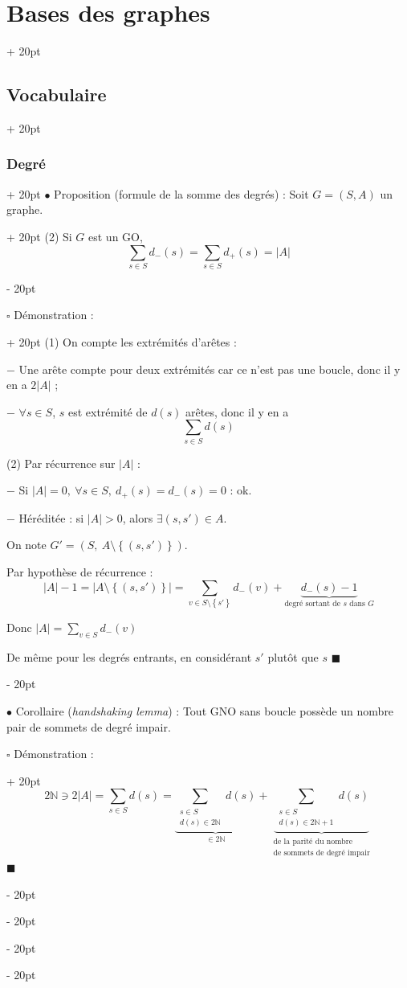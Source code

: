 \documentclass[a4paper, 12pt, twoside]{article}
\newcommand{\N}{\mathbb{N}} %
\newcommand{\set}[1]{\left\{ #1 \right\}}
\newcommand{\abs}[1]{\left\lvert #1 \right\rvert}
\newcommand{\ind}[1][20pt]{\advance\leftskip + #1}
\newcommand{\deind}[1][20pt]{\advance\leftskip - #1}
\newenvironment{indt}[2][20pt]{#2 \par \ind[#1]}{\par \deind} %
\begin{document}
\begin{indt}{\section{Bases des graphes}}
\begin{indt}{\subsection{Vocabulaire}}
\begin{indt}{\subsubsection{Degré}}
\begin{indt}{$\bullet$ Proposition (formule de la somme des degrés) : Soit $G = (S, A)$ un graphe.}
                    (2) Si $G$ est un GO,
                    \[
                        \sum_{s \in S} d_-(s) = \sum_{s \in S} d_+(s) = \abs{A}
                    \]
                \end{indt}

                \begin{indt}{$\square$ Démonstration :}
                    (1) On compte les extrémités d'arêtes :

                    $-$ Une arête compte pour deux extrémités car ce n'est pas une boucle, donc il y en a $2\abs A$ ;

                    $-$ $\forall s \in S$, $s$ est extrémité de $d(s)$ arêtes, donc il y en a
                    \[
                        \sum_{s \in S} d(s)
                    \]
                    
                    (2) Par récurrence sur $\abs A$ :

                    $-$ Si $\abs A = 0,\ \forall s \in S,\ d_+(s) = d_-(s) = 0$ : ok.

                    $-$ Héréditée : si $\abs A > 0$, alors $\exists (s, s') \in A$.

                    On note $G' = (S,\ A \setminus \set{(s, s')})$.

                    Par hypothèse de récurrence :
                    \[
                        \abs A - 1 = \abs{A \setminus \set{(s, s')}} = \sum_{v \in S \setminus \set{s'}} d_-(v) + \underbrace{d_-(s) - 1}_{\text{degré sortant de $s$ dans $G$}}
                    \]
                    
                    Donc $\abs A = \displaystyle \sum_{v \in S} d_-(v)$

                    De même pour les degrés entrants, en considérant $s'$ plutôt que $s$
                    $\blacksquare$
                \end{indt}

                \vspace{6pt}
                
                $\bullet$ Corollaire (\textit{handshaking lemma}) : Tout GNO sans boucle possède un nombre pair de sommets de degré impair.

                \begin{indt}{$\square$ Démonstration :}
                    \[
                        2\N \ni 2\abs A
                        = \sum_{s \in S} d(s)
                        = \underbrace{\sum_{\substack{s \in S \\ d(s) \in 2\N}} d(s)}_{\in 2\N} + \underbrace{\sum_{\substack{s \in S \\ d(s) \in 2\N + 1}} d(s)}_{\substack{\text{de la parité du nombre} \\ \text{de sommets de degré impair}}}
                    \]
                    $\blacksquare$
                \end{indt}
                

\end{indt}
\end{indt}
\end{indt}
\end{document}
